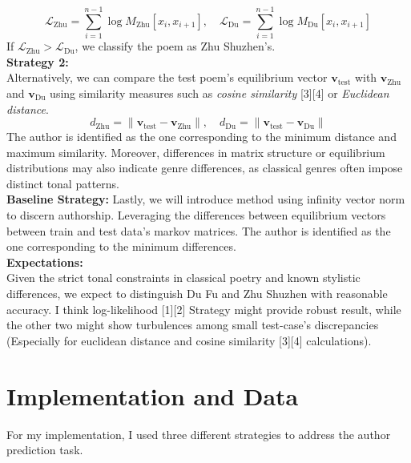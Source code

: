 \documentclass[12pt]{article}
\begin{document}
\[
    \mathcal{L}_{\text{Zhu}} = \sum_{i=1}^{n-1} \log M_{\text{Zhu}}[x_i, x_{i+1}], \quad \mathcal{L}_{\text{Du}} = \sum_{i=1}^{n-1} \log M_{\text{Du}}[x_i, x_{i+1}]
\]
If $\mathcal{L}_{\text{Zhu}} > \mathcal{L}_{\text{Du}}$, we classify the poem as Zhu Shuzhen's.
\\
\textbf{Strategy 2: }
\\
Alternatively, we can compare the test poem’s equilibrium vector $\mathbf{v}_{\text{test}}$ with $\mathbf{v}_{\text{Zhu}}$ and $\mathbf{v}_{\text{Du}}$ using similarity measures such as \textit{cosine similarity} [3][4] or \textit{Euclidean distance}.
\[
    d_{\text{Zhu}} = \|\mathbf{v}_{\text{test}} - \mathbf{v}_{\text{Zhu}}\|, \quad d_{\text{Du}} = \|\mathbf{v}_{\text{test}} - \mathbf{v}_{\text{Du}}\|
\]
The author is identified as the one corresponding to the minimum distance and maximum similarity. Moreover, differences in matrix structure or equilibrium distributions may also indicate genre differences, as classical genres often impose distinct tonal patterns.
\\
\textbf{Baseline Strategy: }
Lastly, we will introduce method using infinity vector norm to discern authorship. Leveraging the differences between equilibrium vectors between train and test data's markov matrices.
The author is identified as the one corresponding to the minimum differences.
\\
\textbf{Expectations: }
\\
Given the strict tonal constraints in classical poetry and known stylistic differences, we expect to distinguish Du Fu and Zhu Shuzhen with reasonable accuracy. 
I think log-likelihood [1][2] Strategy might provide robust result, while the other two might show turbulences among small test-case's discrepancies (Especially for euclidean distance and cosine similarity [3][4] calculations).

\section{Implementation and Data}
\noindent For my implementation, I used three different strategies to address the author prediction task.
\end{document}
